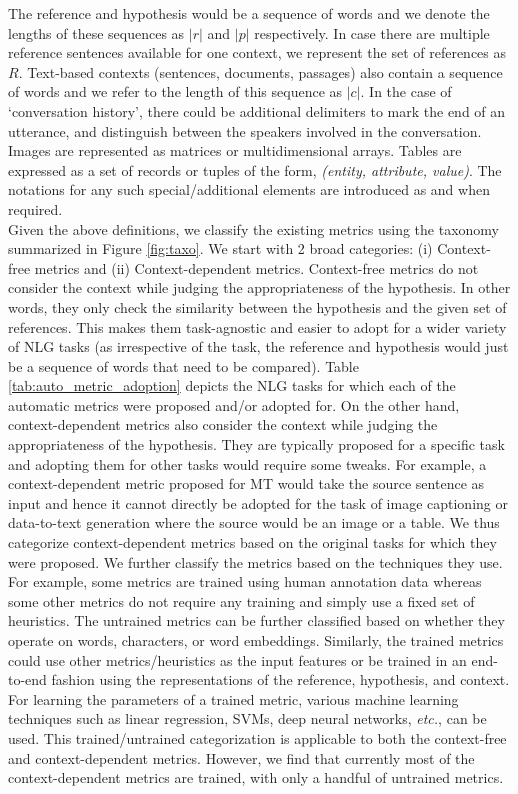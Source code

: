 The reference and hypothesis would be a sequence of words and we denote the lengths of these sequences as $|r|$ and $|p|$ respectively.
In case there are multiple reference sentences available for one context, we represent the set of references as $R$. Text-based contexts (sentences, documents, passages) also contain a sequence of words and we refer to the length of this sequence as $|c|$. In the case of `conversation history', there could be additional delimiters to mark the end of an utterance, and distinguish between the speakers involved in the conversation. Images are represented as matrices or multidimensional arrays. Tables are expressed as a set of records or tuples of the form, \textit{(entity, attribute, value)}. The notations for any such special/additional elements are introduced as and when required.\\
Given the above definitions, we classify the existing metrics using the taxonomy summarized in Figure \ref{fig:taxo}. We start with 2 broad categories: (i) Context-free metrics and (ii) Context-dependent metrics. Context-free metrics do not consider the context while judging the appropriateness of the hypothesis. In other words, they only check the similarity between the hypothesis and the given set of references. This makes them task-agnostic and easier to adopt for a wider variety of NLG tasks (as irrespective of the task, the reference and hypothesis would just be a sequence of words that need to be compared). Table \ref{tab:auto_metric_adoption} depicts the NLG tasks for which each of the automatic metrics were proposed and/or adopted for.  On the other hand, context-dependent metrics also consider the context while judging the appropriateness of the hypothesis. They are typically proposed for a specific task and adopting them for other tasks would require some tweaks. For example, a context-dependent metric proposed for MT would take the source sentence as input and hence it cannot directly be adopted for the task of image captioning or data-to-text generation where the source would be an image or a table. We thus categorize context-dependent metrics based on the original tasks for which they were proposed. 
We further classify the metrics based on the techniques they use. For example, some metrics are trained using human annotation data whereas some other metrics do not require any training and simply use a fixed set of heuristics. The untrained metrics can be further classified based on whether they operate on words, characters, or word embeddings. Similarly, the trained metrics could use other metrics/heuristics as the input features or be trained in an end-to-end fashion using the representations of the reference, hypothesis, and context. For learning the parameters of a trained metric, various machine learning techniques such as linear regression, SVMs, deep neural networks, \textit{etc.}, can be used. This trained/untrained categorization is applicable to both the context-free and context-dependent metrics. However, we find that currently most of the context-dependent metrics are trained, with only a handful of untrained metrics. 
